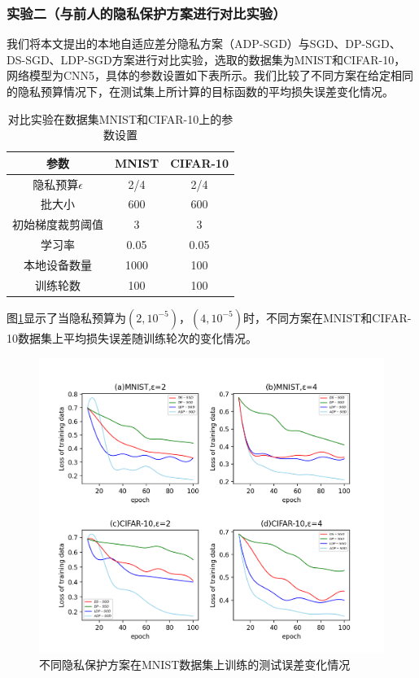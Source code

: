 \subsubsection{实验二（与前人的隐私保护方案进行对比实验）} 
我们将本文提出的本地自适应差分隐私方案（ADP-SGD）与SGD、DP-SGD、DS-SGD、LDP-SGD方案进行对比实验，选取的数据集为MNIST和CIFAR-10，网络模型为CNN5，具体的参数设置如下表所示。我们比较了不同方案在给定相同的隐私预算情况下，在测试集上所计算的目标函数的平均损失误差变化情况。

\begin{table}[H]
	\centering
	\begin{tabular}{ccc}
		\hline
		参数& MNIST& CIFAR-10\\
		\hline
		隐私预算$\epsilon$& 2/4& 2/4\\
		批大小& 600& 600\\
		初始梯度裁剪阈值& 3& 3\\
		学习率& 0.05& 0.05\\
		本地设备数量& 1000& 100\\
		训练轮数& 100& 100\\
		\hline
	\end{tabular}
	\caption{对比实验在数据集MNIST和CIFAR-10上的参数设置}
	\label{tab1}
\end{table}

图\ref{fig:不同隐私保护方案在MNIST数据集上训练的测试误差变化情况}显示了当隐私预算为$\left(2,10^{-5}\right)$，$\left(4,10^{-5}\right)$时，不同方案在MNIST和CIFAR-10数据集上平均损失误差随训练轮次的变化情况。

\begin{figure}[!hbt]
\centering
	\includegraphics[scale=0.7]{fig2/C3/第三章对比实验}%
	\caption{不同隐私保护方案在MNIST数据集上训练的测试误差变化情况}
	\label{fig:不同隐私保护方案在MNIST数据集上训练的测试误差变化情况}	
\end{figure}


